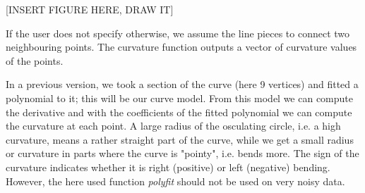[INSERT FIGURE HERE, DRAW IT]


If the user does not specify otherwise, we assume the line pieces to connect two neighbouring points. The curvature function outputs a vector of curvature values of the points.




In a previous version, we  took a section of the curve (here 9 vertices) and fitted a polynomial to it; this will be our curve model. From this model we can compute the derivative and with the coefficients of the fitted polynomial we can compute the curvature at each point. 
A large radius of the osculating circle, i.e. a high curvature, means a rather straight part of the curve, while we get a small radius or curvature in parts where the curve is "pointy", i.e. bends more. The sign of the curvature indicates whether it is right (positive) or left (negative) bending. However, the here used function \textit{polyfit} should not be used on very noisy data.








%
% 
%
%


